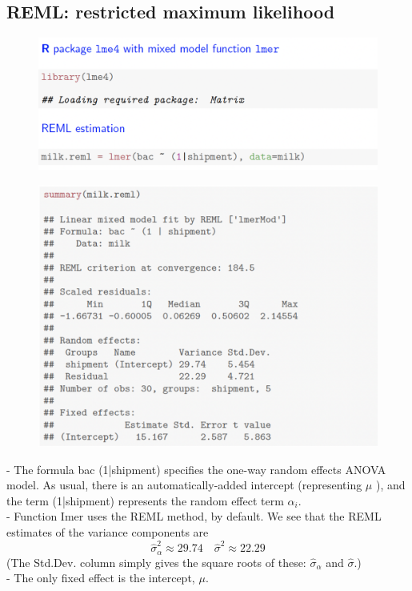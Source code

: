 \documentclass[11pt,a4paper]{article}
\begin{document}
\subsection{REML: restricted maximum likelihood}
\begin{center}\begin{figure}[htb]
    \centering
    \includegraphics[scale=0.4]{REML.png}
    \caption{}
    \label{}
\end{figure}\end{center}
\begin{center}\begin{figure}[htb]
    \centering
    \includegraphics[scale=0.4]{REML2.png}
    \caption{}
    \label{}
\end{figure}\end{center}

- The formula bac (1|shipment) specifies the one-way random effects ANOVA model. As usual, there is an automatically-added intercept (representing $\mu$ ), and the term (1|shipment) represents the random effect term $\alpha_{i}$.\\
- Function Imer uses the REML method, by default. We see that the REML estimates of the variance components are
$$
\widehat{\sigma}_{\alpha}^{2} \approx 29.74 \quad \widehat{\sigma}^{2} \approx 22.29
$$
(The Std.Dev. column simply gives the square roots of these: $\widehat{\sigma}_{\alpha}$ and $\widehat{\sigma}$.)\\
- The only fixed effect is the intercept, $\mu$.\\
\end{document}
